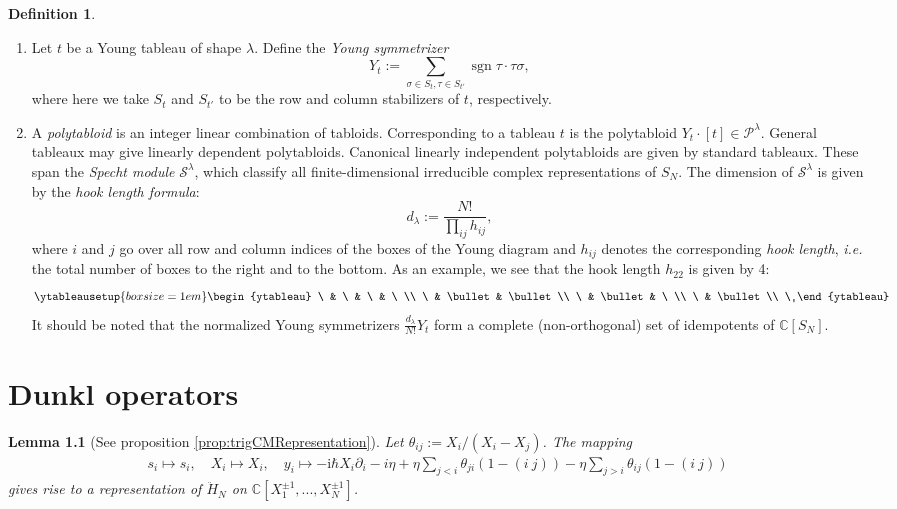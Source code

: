 \documentclass[11pt]{report}
\newtheorem{lemma}[theorem]{Lemma}
\theoremstyle{definition}
\newtheorem{definition}[theorem]{Definition}
\theoremstyle{remark}
\theoremstyle{remark}
\newcommand{\C}{\mathbb{C}}
\newcommand{\I}{\mathrm{i}}
\begin{document}
\begin{definition}
\begin{enumerate}[label=(\roman*)]
\item Let $t$ be a Young tableau of shape $\lambda$. Define the \emph{Young symmetrizer}
\begin{equation*}
Y_t := \sum_{\sigma \in S_t, \tau \in S_{t'}} \operatorname{sgn} \tau \cdot \tau \sigma,
\end{equation*}
where here we take $S_t$ and $S_{t'}$ to be the row and column stabilizers of $t$, respectively.
\item A \emph{polytabloid} is an integer linear combination of tabloids. Corresponding to a tableau $t$ is the polytabloid $Y_t \cdot [t] \in \mathcal{P}^\lambda$. General tableaux may give linearly dependent polytabloids. Canonical linearly independent polytabloids are given by standard tableaux. These span the \emph{Specht module} $\mathcal{S}^\lambda$, which classify all finite-dimensional irreducible complex representations of $S_N$. The dimension of $\mathcal{S}^\lambda$ is given by the \emph{hook length formula}:
\begin{equation*}
d_\lambda := \frac{N!}{\prod_{ij} h_{ij}},
\end{equation*}
where $i$ and $j$ go over all row and column indices of the boxes of the Young diagram and $h_{ij}$ denotes the corresponding \emph{hook length}, \emph{i.e.} the total number of boxes to the right and to the bottom. As an example, we see that the hook length $h_{22}$ is given by 4:
\begin{equation*}
\ytableausetup{boxsize=1em}
\begin{ytableau}
\ & \ & \ & \ \\
\ & \bullet & \bullet \\
\ & \bullet & \ \\
\ & \bullet \\
\
\end{ytableau}
\end{equation*}
It should be noted that the normalized Young symmetrizers $\frac{d_\lambda}{N!} Y_t$ form a complete (non-orthogonal) set of idempotents of $\C[S_N]$.
\end{enumerate}
\end{definition}

\chapter{Dunkl operators}\label{appendix:dunklOperators}

\begin{lemma}[See proposition \ref{prop:trigCMRepresentation}]\label{lemma:trigCMRepresentationAppendix}
Let $\theta_{ij} := X_i/(X_i-X_j)$. The mapping
\begin{align*}
s_i \mapsto s_i, \quad X_i \mapsto X_i, \quad y_i \mapsto -\I \hbar X_i \partial_i - i \eta + \eta \sum_{j < i} \theta_{ji} (1-(i \ j)) - \eta \sum_{j > i} \theta_{ij} (1-(i \ j))
\end{align*}
gives rise to a representation of $\ddot H_N$ on $\C[X_1^{\pm 1},...,X_N^{\pm 1}]$.
\end{lemma}
\end{document}
